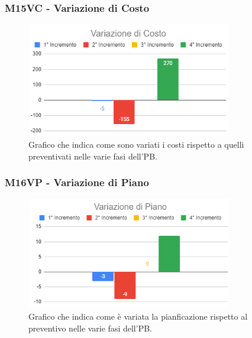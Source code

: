 \subsubsection{M15VC - Variazione di Costo}
\begin{figure}[H]
    \centering\includegraphics[width=0.8\textwidth, height=0.8\textheight,keepaspectratio]{images/PB-Variazione-di-Costo.png}
    \caption{Grafico che indica come sono variati i costi rispetto a quelli preventivati nelle varie fasi dell'PB.}
\end{figure}    

\subsubsection{M16VP - Variazione di Piano}
\begin{figure}[H]
    \centering\includegraphics[width=0.8\textwidth, height=0.8\textheight,keepaspectratio]{images/PB-Variazione-di-Piano.png}
    \caption{Grafico che indica come è variata la pianficazione rispetto al preventivo nelle varie fasi dell'PB.}
\end{figure}  